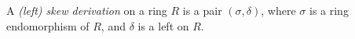 \documentclass{article}
\begin{document}
A {\it (left) skew derivation}
on a ring $R$ is a pair $(\sigma, \delta)$,
where $\sigma$ is a ring endomorphism of $R$,
and $\delta$ is a left  on $R$.
\end{document}
